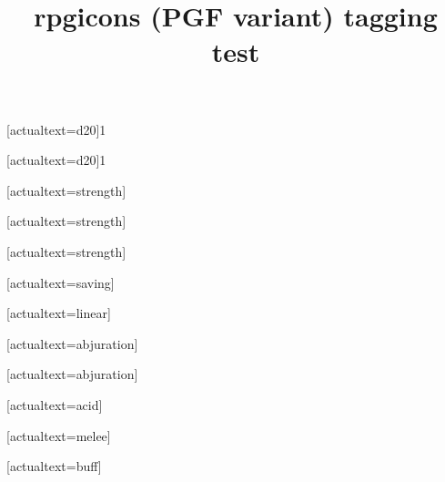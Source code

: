 \documentclass{article}
\title{rpgicons (PGF variant) tagging test}
\begin{document}
[actualtext={d20}]{1}

[actualtext={d20}]{1}

[actualtext={strength}]

[actualtext={strength}]

[actualtext={strength}]

\saving[empty]{}[actualtext={saving}]

[actualtext={linear}]

[actualtext={abjuration}]

[actualtext={abjuration}]

[actualtext={acid}]

[actualtext={melee}]

[actualtext={buff}]

\end{document}
